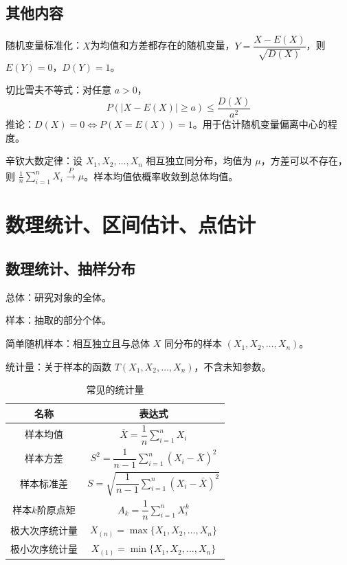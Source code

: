 \documentclass[UTF8]{ctexart}
\newcommand\Concept[1]{\textcolor{cyan!70!black}{#1}}
\begin{document}
\subsection{其他内容}
随机变量\Concept{标准化}：$X$为均值和方差都存在的随机变量，$Y=\dfrac{X-E(X)}{\sqrt{D(X)}}$，则 $E(Y)=0$，$D(Y)=1$。

\Concept{切比雪夫不等式}：对任意 $a>0$，
\begin{equation}\label{eq:切比雪夫不等式}
  P\left(|X-E(X)|\geqslant a\right) \leqslant \dfrac{D(X)}{a^2}
\end{equation}
推论：$D(X)=0 \iff P(X=E(X))=1$。用于估计随机变量偏离中心的程度。

辛钦大数定律：设 $X_1,X_2,\dots,X_n$ 相互独立同分布，均值为 $\mu$，方差可以不存在，则 $\frac1n\sum_{i=1}^n X_i \xrightarrow{P} \mu$。样本均值依概率收敛到总体均值。

\section{数理统计、区间估计、点估计}
\subsection{数理统计、抽样分布}
总体：研究对象的全体。

样本：抽取的部分个体。

简单随机样本：相互独立且与总体 $X$ 同分布的样本 $(X_1,X_2,\dots,X_n)$。

统计量：关于样本的函数 $T(X_1,X_2,\dots,X_n)$，不含未知参数。
\begin{table}[htb]
\renewcommand\arraystretch{1.7}
  \centering
  \begin{tabular}{cc}
  \toprule
  名称 & 表达式 \\
  \midrule
  样本均值 & $\displaystyle \bar{X} = \dfrac1n\sum\limits_{i=1}^n X_i$ \\
  样本方差 & $\displaystyle S^2 = \dfrac{1}{n-1}\sum\limits_{i=1}^n (X_i-\bar{X})^2$ \\
  样本标准差 & $\displaystyle S = \sqrt{\dfrac{1}{n-1}\sum\limits_{i=1}^n (X_i-\bar{X})^2}$ \\
  样本$k$阶原点矩 & $\displaystyle A_k = \dfrac1n\sum\limits_{i=1}^n X_i^k$ \\
  极大次序统计量 & $X_{(n)} = \max\{X_1,X_2,\dots,X_n\}$ \\
  极小次序统计量 & $X_{(1)} = \min\{X_1,X_2,\dots,X_n\}$ \\
  \bottomrule
  \end{tabular}
  \caption{常见的统计量}\label{tab:统计量}
\end{table}
\end{document}

